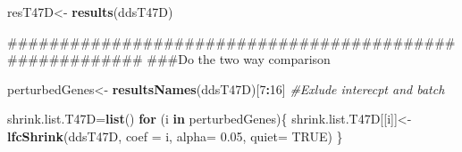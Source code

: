 \documentclass[]{article}
\newenvironment{Shaded}{\begin{snugshade}}{\end{snugshade}}
\newcommand{\KeywordTok}[1]{\textcolor[rgb]{0.13,0.29,0.53}{\textbf{#1}}}
\newcommand{\DataTypeTok}[1]{\textcolor[rgb]{0.13,0.29,0.53}{#1}}
\newcommand{\DecValTok}[1]{\textcolor[rgb]{0.00,0.00,0.81}{#1}}
\newcommand{\FloatTok}[1]{\textcolor[rgb]{0.00,0.00,0.81}{#1}}
\newcommand{\StringTok}[1]{\textcolor[rgb]{0.31,0.60,0.02}{#1}}
\newcommand{\CommentTok}[1]{\textcolor[rgb]{0.56,0.35,0.01}{\textit{#1}}}
\newcommand{\OtherTok}[1]{\textcolor[rgb]{0.56,0.35,0.01}{#1}}
\newcommand{\ControlFlowTok}[1]{\textcolor[rgb]{0.13,0.29,0.53}{\textbf{#1}}}
\newcommand{\OperatorTok}[1]{\textcolor[rgb]{0.81,0.36,0.00}{\textbf{#1}}}
\newcommand{\NormalTok}[1]{#1}
\begin{document}
\begin{Shaded}
\begin{Highlighting}[]
\NormalTok{resT47D<-}\StringTok{ }\KeywordTok{results}\NormalTok{(ddsT47D)}

\NormalTok{########################################################}
\NormalTok{###Do the two way comparison}

\NormalTok{perturbedGenes<-}\StringTok{ }\KeywordTok{resultsNames}\NormalTok{(ddsT47D)[}\DecValTok{7}\OperatorTok{:}\DecValTok{16}\NormalTok{] }\CommentTok{#Exlude interecpt and batch}


\NormalTok{shrink.list.T47D=}\KeywordTok{list}\NormalTok{()}
\ControlFlowTok{for}\NormalTok{ (i }\ControlFlowTok{in}\NormalTok{ perturbedGenes)\{}
\NormalTok{    shrink.list.T47D[[i]]<-}\StringTok{ }\KeywordTok{lfcShrink}\NormalTok{(ddsT47D, }
                                 \DataTypeTok{coef =}\NormalTok{ i,}
                                 \DataTypeTok{alpha=} \FloatTok{0.05}\NormalTok{,}
                                 \DataTypeTok{quiet=} \OtherTok{TRUE}\NormalTok{)}
\NormalTok{\}}
\end{Highlighting}
\end{Shaded}

\begin{Shaded}
\end{Shaded}
\end{document}
